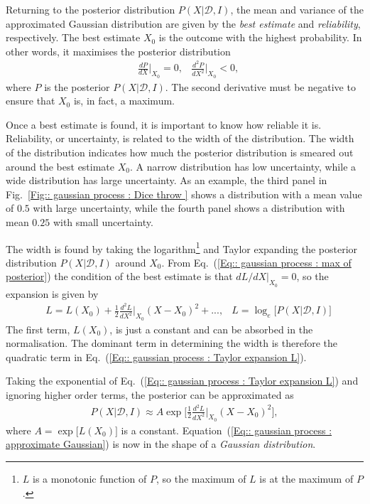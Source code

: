 \documentclass[twoside,english]{uiofysmaster}
\begin{document}
{{Returning to the posterior distribution $P(X | \mathcal{D}, I)$, the mean and variance of the approximated Gaussian distribution are given by the \textit{best estimate} and \textit{reliability}, respectively. The best estimate $X_0$  is the outcome with the highest probability. In other words, it maximises the posterior distribution
\begin{align}\label{Eq:: gaussian process : max of posterior}
&\frac{dP}{dX}\Big|_{X_0} = 0, &\frac{d^2P}{dX^2}\Big|_{X_0} < 0,
\end{align}
where $P$ is the posterior $P(X| \mathcal{D}, I)$. The second derivative must be negative to ensure that $X_0$ is, in fact, a maximum. 

Once a best estimate is found, it is important to know how reliable it is. Reliability, or uncertainty, is related to the width of the distribution. The width of the distribution indicates how much the posterior distribution is smeared out around the best estimate $X_0$. A narrow distribution has low uncertainty, while a wide distribution has large uncertainty. As an example, the third panel in Fig.~\ref{Fig:: gaussian process : Dice throw } shows a distribution with a mean value of $0.5$ with large uncertainty, while the fourth panel shows a distribution with mean $0.25$ with small uncertainty. 

The width is found by taking the logarithm\footnote{$L$ is a monotonic function of $P$, so the maximum of $L$ is at the maximum of $P$.} and Taylor expanding the posterior distribution $P(X| \mathcal{D}, I)$ around $X_0$. From Eq.~(\ref{Eq:: gaussian process : max of posterior}) the condition of the best estimate is that $dL/dX|_{X_0} =0$, so the expansion is given by
\begin{align}
&L = L(X_0) + \frac{1}{2} \frac{d^2L}{dX^2}\Big|_{X_0} (X-X_0)^2 +... ,&L = \log_e \Big[P(X | \mathcal{D}, I ) \Big]\label{Eq:: gaussian process : Taylor expansion L}
\end{align}
The first term, $L(X_0)$, is just a constant and can be absorbed in the normalisation. The dominant term in determining the width is therefore the quadratic term in Eq.~(\ref{Eq:: gaussian process : Taylor expansion L}).

Taking the exponential of Eq.~(\ref{Eq:: gaussian process : Taylor expansion L}) and ignoring higher order terms, the posterior can be approximated as
\begin{align}\label{Eq:: gaussian process : approximate Gaussian}
P(X | \mathcal{D}, I) \approx A \exp \Bigg[ \frac{1}{2} \frac{d^2L}{dX^2}\Big|_{X_0} (X-X_0)^2 \Bigg], 
\end{align} 
where $A = \exp \big[L(X_0) \big]$ is a constant. Equation~(\ref{Eq:: gaussian process : approximate Gaussian}) is now in the shape of a \textit{Gaussian distribution}.


}}
\end{document}
